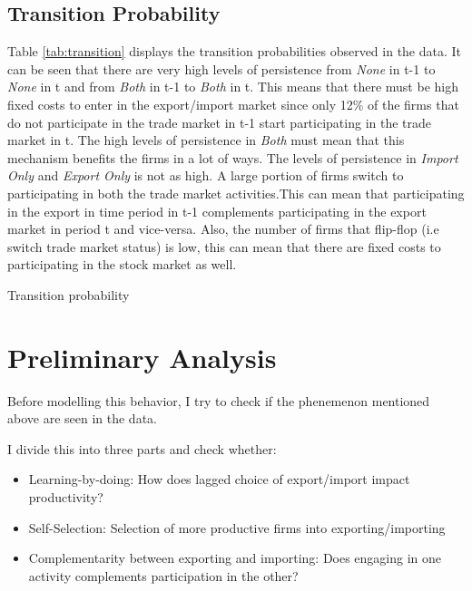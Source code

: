 \documentclass[11pt]{article}
\begin{document}
\subsection{Transition Probability}
Table \ref{tab:transition} displays the transition probabilities observed in the data. It
can be seen that there are very high levels of persistence from
\textit{None} in t-1 to \textit{None} in t  and from \textit{Both} in
t-1 to \textit{Both} in t. This means that there must be high fixed
costs to enter in the export/import market since only 12\% of the
firms  that do not participate in the trade market in t-1 start
participating in the trade market in t. The high levels of persistence
in \textit{Both} must mean that this mechanism benefits the firms in a
lot of ways. The levels of persistence in \textit{Import Only} and \textit{Export Only}  is not as high. A large
portion of firms switch to participating in both the trade market
activities.This can mean that participating in the export in time
period in t-1 complements participating in the export market in period
t and vice-versa. Also, the number of firms that flip-flop (i.e switch
trade market status) is low, this can mean that there are fixed costs
to participating in the stock market as well. 
\begin{center}
\begin{table}[!htp]
\caption{Transition probability}
\label{tab:transition}

\end{table}
\end{center}

\section{Preliminary Analysis}
Before modelling this behavior, I try to check if the phenemenon
mentioned above are seen in the data. 

I divide this into three parts and check whether: 
\begin{itemize}
\item Learning-by-doing: How does lagged choice of export/import
  impact productivity?
\item Self-Selection: Selection of more productive firms into
  exporting/importing
\item Complementarity between exporting and importing: Does engaging
  in one activity complements participation in the other?
\end{itemize}
\end{document}
